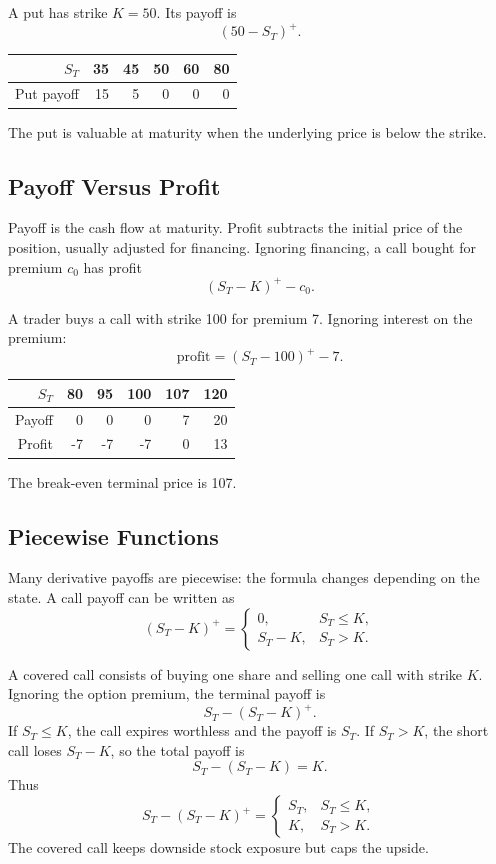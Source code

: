 \begin{exmp}
A put has strike $K=50$. Its payoff is
\[
    (50-S_T)^+.
\]
\begin{tabular}{@{}rrrrrr@{}}
\toprule
$S_T$ & 35 & 45 & 50 & 60 & 80 \\
\midrule
Put payoff & 15 & 5 & 0 & 0 & 0 \\
\bottomrule
\end{tabular}
The put is valuable at maturity when the underlying price is below the strike.
\end{exmp}

\subsection{Payoff Versus Profit}

Payoff is the cash flow at maturity. Profit subtracts the initial price of the
position, usually adjusted for financing. Ignoring financing, a call bought for
premium $c_0$ has profit
\[
    (S_T-K)^+ - c_0.
\]

\begin{exmp}
A trader buys a call with strike 100 for premium 7. Ignoring interest on the
premium:
\[
    \text{profit}=(S_T-100)^+-7.
\]
\begin{tabular}{@{}rrrrrr@{}}
\toprule
$S_T$ & 80 & 95 & 100 & 107 & 120 \\
\midrule
Payoff & 0 & 0 & 0 & 7 & 20 \\
Profit & -7 & -7 & -7 & 0 & 13 \\
\bottomrule
\end{tabular}
The break-even terminal price is 107.
\end{exmp}

\subsection{Piecewise Functions}

Many derivative payoffs are piecewise: the formula changes depending on the
state. A call payoff can be written as
\[
    (S_T-K)^+
    =
    \begin{cases}
    0, & S_T\leq K,\\
    S_T-K, & S_T>K.
    \end{cases}
\]

\begin{exmp}
A covered call consists of buying one share and selling one call with strike
$K$. Ignoring the option premium, the terminal payoff is
\[
    S_T-(S_T-K)^+.
\]
If $S_T\leq K$, the call expires worthless and the payoff is $S_T$. If $S_T>K$,
the short call loses $S_T-K$, so the total payoff is
\[
    S_T-(S_T-K)=K.
\]
Thus
\[
    S_T-(S_T-K)^+
    =
    \begin{cases}
    S_T, & S_T\leq K,\\
    K, & S_T>K.
    \end{cases}
\]
The covered call keeps downside stock exposure but caps the upside.
\end{exmp}

